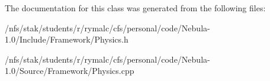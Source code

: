 The documentation for this class was generated from the following files:\begin{DoxyCompactItemize}
\item 
/nfs/stak/students/r/rymalc/cfs/personal/code/Nebula-\/1.0/Include/Framework/Physics.h\item 
/nfs/stak/students/r/rymalc/cfs/personal/code/Nebula-\/1.0/Source/Framework/Physics.cpp\end{DoxyCompactItemize}
